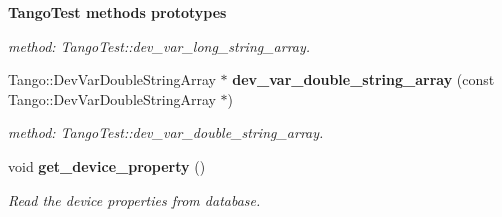 \begin{Indent}{\bf Tango\-Test methods prototypes}
\begin{CompactItemize}
\begin{CompactList}\small\item\em method: Tango\-Test::dev\_\-var\_\-long\_\-string\_\-array.\item\end{CompactList}\item 
Tango::Dev\-Var\-Double\-String\-Array $\ast$ {\bf dev\_\-var\_\-double\_\-string\_\-array} (const Tango::Dev\-Var\-Double\-String\-Array $\ast$)
\begin{CompactList}\small\item\em method: Tango\-Test::dev\_\-var\_\-double\_\-string\_\-array.\item\end{CompactList}\item 
void {\bf get\_\-device\_\-property} ()
\begin{CompactList}\small\item\em Read the device properties from database.\item\end{CompactList}\end{CompactItemize}
\end{Indent}
